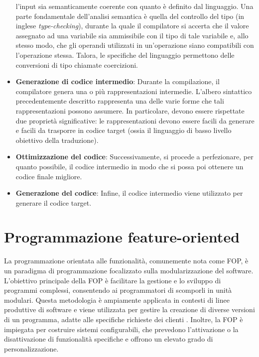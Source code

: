 \documentclass[12pt,a4paper,openright,twoside]{book}
\begin{document}
\begin{itemize}
    l'input sia semanticamente coerente con quanto è definito dal linguaggio. Una parte fondamentale dell'analisi semantica è quella del 
    controllo del tipo (in inglese \textit{type-checking}), durante la quale il compilatore si accerta che il valore assegnato ad una 
    variabile sia ammissibile con il tipo di tale variabile e, allo stesso modo, che gli operandi utilizzati in un’operazione siano 
    compatibili con l’operazione stessa. Talora, le specifiche del linguaggio permettono delle conversioni di tipo chiamate coercizioni.
    \item \textbf{Generazione di codice intermedio}: Durante la compilazione, il compilatore genera una o più rappresentazioni intermedie. 
    L'albero sintattico precedentemente descritto rappresenta una delle varie forme che tali rappresentazioni possono assumere. In particolare, 
    devono essere rispettate due proprietà significative: le rappresentazioni devono essere facili da generare e facili da trasporre in codice 
    target (ossia il linguaggio di basso livello obiettivo della traduzione).
    \item \textbf{Ottimizzazione del codice}: Successivamente, si procede a perfezionare, per quanto possibile, il codice intermedio in modo 
    che si possa poi ottenere un codice finale migliore.
    \item \textbf{Generazione del codice}: Infine, il codice intermedio viene utilizzato per generare il codice target.
\end{itemize}

\section{Programmazione feature-oriented}
La programmazione orientata alle funzionalità, comunemente nota come \ac{FOP}, è un paradigma di programmazione focalizzato sulla modularizzazione 
del software. L’obiettivo principale della \ac{FOP} è facilitare la gestione e lo sviluppo di programmi complessi, consentendo ai programmatori 
di scomporli in unità modulari. Questa metodologia è ampiamente applicata in contesti di linee produttive di software e viene utilizzata per 
gestire la creazione di diverse versioni di un programma, adatte alle specifiche richieste dei clienti \cite{Apel2013}. Inoltre, la \ac{FOP} è 
impiegata per costruire sistemi configurabili, che prevedono l’attivazione o la disattivazione di funzionalità specifiche e offrono un elevato 
grado di personalizzazione.
\end{document}
